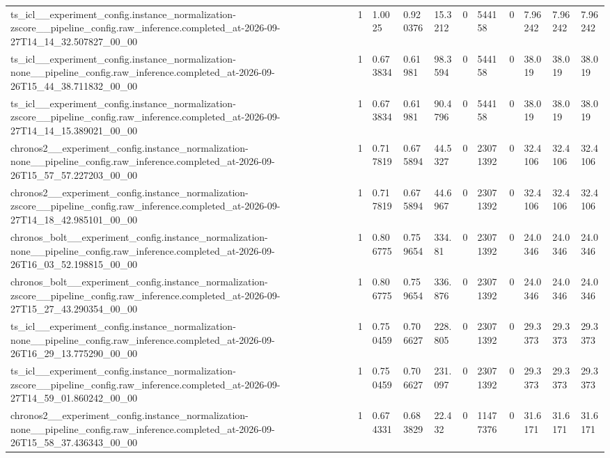\begin{tabular}{lllllllllll}
ts\_icl\_\_experiment\_config.instance\_normalization-zscore\_\_pipeline\_config.raw\_inference.completed\_at-2026-09-27T14\_14\_32.507827\_00\_00 & 1 & 1.0025 & 0.920376 & 15.3212 & 0 & 544158 & 0 & 7.96242 & 7.96242 & 7.96242 \\
ts\_icl\_\_experiment\_config.instance\_normalization-none\_\_pipeline\_config.raw\_inference.completed\_at-2026-09-26T15\_44\_38.711832\_00\_00 & 1 & 0.673834 & 0.61981 & 98.3594 & 0 & 544158 & 0 & 38.019 & 38.019 & 38.019 \\
ts\_icl\_\_experiment\_config.instance\_normalization-zscore\_\_pipeline\_config.raw\_inference.completed\_at-2026-09-27T14\_14\_15.389021\_00\_00 & 1 & 0.673834 & 0.61981 & 90.4796 & 0 & 544158 & 0 & 38.019 & 38.019 & 38.019 \\
chronos2\_\_experiment\_config.instance\_normalization-none\_\_pipeline\_config.raw\_inference.completed\_at-2026-09-26T15\_57\_57.227203\_00\_00 & 1 & 0.717819 & 0.675894 & 44.5327 & 0 & 23071392 & 0 & 32.4106 & 32.4106 & 32.4106 \\
chronos2\_\_experiment\_config.instance\_normalization-zscore\_\_pipeline\_config.raw\_inference.completed\_at-2026-09-27T14\_18\_42.985101\_00\_00 & 1 & 0.717819 & 0.675894 & 44.6967 & 0 & 23071392 & 0 & 32.4106 & 32.4106 & 32.4106 \\
chronos\_bolt\_\_experiment\_config.instance\_normalization-none\_\_pipeline\_config.raw\_inference.completed\_at-2026-09-26T16\_03\_52.198815\_00\_00 & 1 & 0.806775 & 0.759654 & 334.81 & 0 & 23071392 & 0 & 24.0346 & 24.0346 & 24.0346 \\
chronos\_bolt\_\_experiment\_config.instance\_normalization-zscore\_\_pipeline\_config.raw\_inference.completed\_at-2026-09-27T15\_27\_43.290354\_00\_00 & 1 & 0.806775 & 0.759654 & 336.876 & 0 & 23071392 & 0 & 24.0346 & 24.0346 & 24.0346 \\
ts\_icl\_\_experiment\_config.instance\_normalization-none\_\_pipeline\_config.raw\_inference.completed\_at-2026-09-26T16\_29\_13.775290\_00\_00 & 1 & 0.750459 & 0.706627 & 228.805 & 0 & 23071392 & 0 & 29.3373 & 29.3373 & 29.3373 \\
ts\_icl\_\_experiment\_config.instance\_normalization-zscore\_\_pipeline\_config.raw\_inference.completed\_at-2026-09-27T14\_59\_01.860242\_00\_00 & 1 & 0.750459 & 0.706627 & 231.097 & 0 & 23071392 & 0 & 29.3373 & 29.3373 & 29.3373 \\
chronos2\_\_experiment\_config.instance\_normalization-none\_\_pipeline\_config.raw\_inference.completed\_at-2026-09-26T15\_58\_37.436343\_00\_00 & 1 & 0.674331 & 0.683829 & 22.432 & 0 & 11477376 & 0 & 31.6171 & 31.6171 & 31.6171 \\

\end{tabular}
